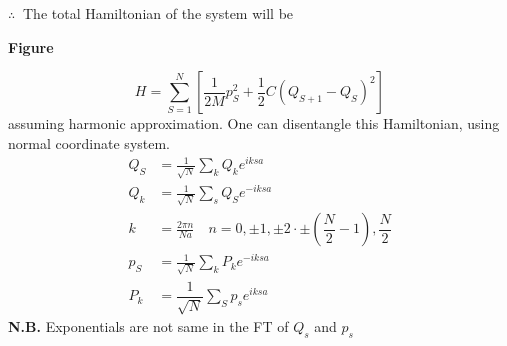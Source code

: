 $\therefore \ $ The total Hamiltonian of the system will be
\begin{center}
{\bf Figure}
\end{center}
$$
H=\sum\limits^{N}_{S=1}\left[\frac{1}{2M}p^{2}_{S}+\frac{1}{2}C(Q_{S+1}-Q_{S})^{2}\right]
$$
assuming harmonic approximation. One can disentangle this Hamiltonian, using normal coordinate system.
\begin{align*}
Q_{S} &= \frac{1}{\sqrt{N}}\sum\limits_{k}Q_{k}e^{iksa}\\
Q_{k} &= \frac{1}{\sqrt{N}}\sum\limits_{s}Q_{S}e^{-iksa}\\
k &= \frac{2\pi n}{Na}\quad n=0, \pm 1, \pm 2\cdot \pm \left(\dfrac{N}{2}-1\right), \dfrac{N}{2}\\
p_{S} &= \frac{1}{\sqrt{N}}\sum\limits_{k}P_{k}e^{-iksa}\\
P_{k} &= \dfrac{1}{\sqrt{N}}\sum\limits_{S}p_{s}e^{iksa}
\end{align*}
{\bf N.B.} Exponentials are not same in the FT of $Q_{s}$ and $p_{s}$

